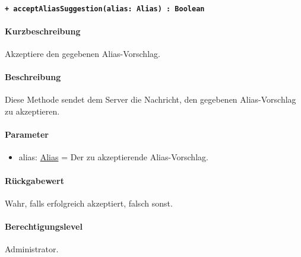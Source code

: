 \paragraph{\texttt{+ acceptAliasSuggestion(alias: Alias) : Boolean}}\label{AP_Backend_acceptAliasSuggestion}%
\paragraph*{Kurzbeschreibung}
Akzeptiere den gegebenen Alias-Vorschlag.
\paragraph*{Beschreibung}
Diese Methode sendet dem Server die Nachricht, den gegebenen Alias-Vorschlag zu akzeptieren.
\paragraph*{Parameter}
\begin{itemize}
    \item alias: \hyperref[AP_Alias]{Alias} = Der zu akzeptierende Alias-Vorschlag.
\end{itemize}
\paragraph*{Rückgabewert}
Wahr, falls erfolgreich akzeptiert, falsch sonst.
\paragraph*{Berechtigungslevel}
Administrator.